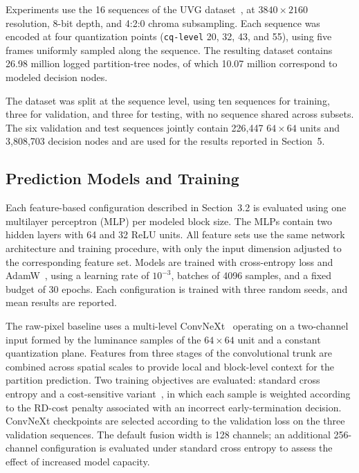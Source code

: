 \documentclass{article}
\begin{document}
Experiments use the 16 sequences of the UVG dataset~\cite{mercat2020uvgdataset}, at $3840\times2160$ resolution, 8-bit depth, and 4:2:0 chroma subsampling. Each sequence was encoded at four quantization points (\texttt{cq-level} 20, 32, 43, and 55), using five frames uniformly sampled along the sequence. The resulting dataset contains 26.98 million logged partition-tree nodes, of which 10.07 million correspond to modeled decision nodes.

The dataset was split at the sequence level, using ten sequences for training, three for validation, and three for testing, with no sequence shared across subsets. The six validation and test sequences jointly contain 226,447 $64\times64$ units and 3,808,703 decision nodes and are used for the results reported in Section~5.

\subsection{Prediction Models and Training}

Each feature-based configuration described in Section~3.2 is evaluated using one multilayer perceptron (MLP) per modeled block size. The MLPs contain two hidden layers with 64 and 32 ReLU units. All feature sets use the same network architecture and training procedure, with only the input dimension adjusted to the corresponding feature set. Models are trained with cross-entropy loss and AdamW~\cite{loshchilov2019adamw}, using a learning rate of $10^{-3}$, batches of 4096 samples, and a fixed budget of 30 epochs. Each configuration is trained with three random seeds, and mean results are reported.

The raw-pixel baseline uses a multi-level ConvNeXt~\cite{liu2022convnext} operating on a two-channel input formed by the luminance samples of the $64\times64$ unit and a constant quantization plane. Features from three stages of the convolutional trunk are combined across spatial scales to provide local and block-level context for the partition prediction. Two training objectives are evaluated: standard cross entropy and a cost-sensitive variant~\cite{elkan2001costsensitivelearning}, in which each sample is weighted according to the RD-cost penalty associated with an incorrect early-termination decision. ConvNeXt checkpoints are selected according to the validation loss on the three validation sequences. The default fusion width is 128 channels; an additional 256-channel configuration is evaluated under standard cross entropy to assess the effect of increased model capacity.
\end{document}
